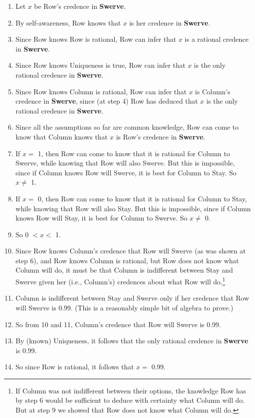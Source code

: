 \documentclass[
  11pt,
]{article}
\providecommand{\tightlist}{%
  \setlength{\itemsep}{0pt}\setlength{\parskip}{0pt}}
\begin{document}
\begin{enumerate}
\def\labelenumi{\arabic{enumi}.}
\tightlist
\item
  Let \(x\) be Row's credence in \textbf{Swerve}.
\item
  By self-awareness, Row knows that \(x\) is her credence in \textbf{Swerve}.
\item
  Since Row knows Row is rational, Row can infer that \(x\) is a rational credence in \textbf{Swerve}.
\item
  Since Row knows Uniqueness is true, Row can infer that \(x\) is the only rational credence in \textbf{Swerve}.
\item
  Since Row knows Column is rational, Row can infer that \(x\) is Column's credence in \textbf{Swerve}, since (at step 4) Row has deduced that \(x\) is the only rational credence in \textbf{Swerve}.
\item
  Since all the assumptions so far are common knowledge, Row can come to know that Column knows that \(x\) is Row's credence in \textbf{Swerve}.
\item
  If \(x =\) 1, then Row can come to know that it is rational for Column to Swerve, while knowing that Row will also Swerve. But this is impossible, since if Column knows Row will Swerve, it is best for Column to Stay. So \(x \neq\) 1.
\item
  If \(x =\) 0, then Row can come to know that it is rational for Column to Stay, while knowing that Row will also Stay. But this is impossible, since if Column knows Row will Stay, it is best for Column to Swerve. So \(x \neq\) 0.
\item
  So 0 \(< x <\) 1.
\item
  Since Row knows Column's credence that Row will Swerve (as was shown at step 6), and Row knows Column is rational, but Row does not know what Column will do, it must be that Column is indifferent between Stay and Swerve given her (i.e., Column's) credences about what Row will do.\footnote{If Column was not indifferent between their options, the knowledge Row has by step 6 would be sufficient to deduce with certainty what Column will do. But at step 9 we showed that Row does not know what Column will do.}
\item
  Column is indifferent between Stay and Swerve only if her credence that Row will Swerve is 0.99. (This is a reasonably simple bit of algebra to prove.)
\item
  So from 10 and 11, Column's credence that Row will Swerve is 0.99.
\item
  By (known) Uniqueness, it follows that the only rational credence in \textbf{Swerve} is 0.99.
\item
  So since Row is rational, it follows that \(x =\) 0.99.
\end{enumerate}
\end{document}
